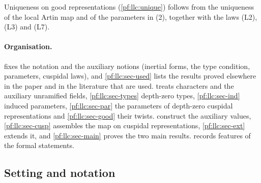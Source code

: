 Uniqueness on good representations (\cref{pf:llc:unique}) follows from the uniqueness of the local
Artin map and of the parameters in (2), together with the laws (L2), (L3) and (L7).

\paragraph{Organisation.}  fixes the notation and the auxiliary notions
(inertial forms, the type condition, parameters, cuspidal laws), and \cref{pf:llc:sec-used} lists
the results proved elsewhere in the paper and in the literature that are used.
 treats characters and the auxiliary unramified fields,
\cref{pf:llc:sec-types} depth-zero types, \cref{pf:llc:sec-ind} induced parameters,
\cref{pf:llc:sec-par} the parameters of depth-zero cuspidal representations and \cref{pf:llc:sec-good}
their twists.  construct the auxiliary values,
\cref{pf:llc:sec-cusp} assembles the map on cuspidal representations, \cref{pf:llc:sec-ext} extends
it, and \cref{pf:llc:sec-main} proves the two main results.  records
features of the formal statements.

\subsection{Setting and notation}\label{pf:llc:sec-setting}

